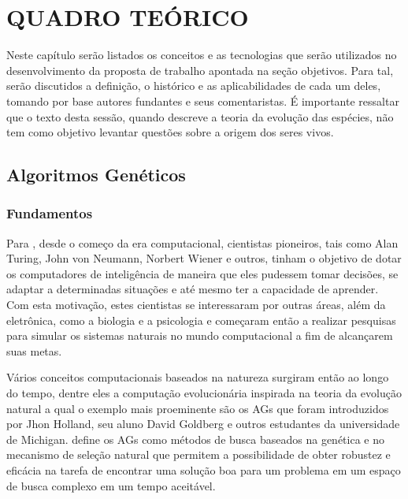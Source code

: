 \chapter{QUADRO TEÓRICO}

\par Neste capítulo serão listados os conceitos e as tecnologias que serão
utilizados no desenvolvimento da proposta de trabalho apontada na seção 
objetivos. Para tal, serão discutidos a definição, o histórico e as 
aplicabilidades de cada um deles, tomando por base autores fundantes e 
seus comentaristas. É importante ressaltar que o texto desta sessão, quando
descreve a teoria da evolução das espécies, não tem como objetivo levantar
questões sobre a origem dos seres vivos.

\section{Algoritmos Genéticos}

\subsection{Fundamentos}

\par Para , desde o começo da
era computacional, cientistas pioneiros, tais como Alan Turing, John von
Neumann, Norbert Wiener e outros, tinham o objetivo de dotar os computadores de inteligência
de maneira que eles pudessem tomar decisões, se adaptar a determinadas situações
e até mesmo ter a capacidade de aprender. Com esta motivação, estes cientistas
se interessaram por outras áreas, além da eletrônica, como  a
biologia e a psicologia e começaram então a realizar pesquisas para simular os
sistemas naturais no mundo computacional a fim de alcançarem suas metas. 

\par Vários conceitos computacionais baseados na natureza surgiram então ao
longo do tempo, dentre eles a computação evolucionária inspirada na teoria da evolução natural
a qual o exemplo mais proeminente são os AGs que foram introduzidos por Jhon Holland, seu aluno
David Goldberg e outros estudantes da universidade de Michigan.
 define os AGs como métodos de busca baseados na
genética e no mecanismo de seleção natural que permitem a possibilidade de obter
robustez e eficácia na tarefa de encontrar uma solução boa para um problema em um espaço de busca
complexo em um tempo aceitável.


